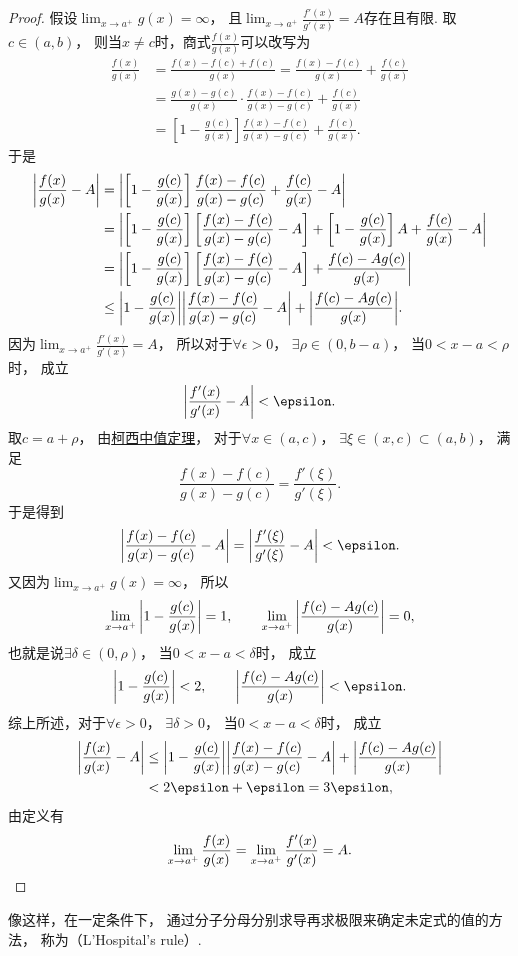 \begin{theorem}
\begin{proof}
假设\(\lim_{x \to a^+} g(x) = \infty\)，
且\(\lim_{x \to a^+} \frac{f'(x)}{g'(x)} = A\)存在且有限.
取\(c\in(a,b)\)，
则当\(x \neq c\)时，商式\(\frac{f(x)}{g(x)}\)可以改写为\begin{align*}
	\frac{f(x)}{g(x)}
	&= \frac{f(x) - f(c) + f(c)}{g(x)}
	= \frac{f(x) - f(c)}{g(x)} + \frac{f(c)}{g(x)} \\
	&= \frac{g(x) - g(c)}{g(x)} \cdot \frac{f(x) - f(c)}{g(x) - g(c)} + \frac{f(c)}{g(x)} \\
	&= \left[1 - \frac{g(c)}{g(x)}\right] \frac{f(x) - f(c)}{g(x) - g(c)} + \frac{f(c)}{g(x)}.
\end{align*}
于是\begin{align*}
	\abs{\frac{f(x)}{g(x)} - A}
	&= \abs{
		\left[1 - \frac{g(c)}{g(x)}\right] \frac{f(x) - f(c)}{g(x) - g(c)}
		+ \frac{f(c)}{g(x)} - A
	} \\
	&= \abs{
		\left[1 - \frac{g(c)}{g(x)}\right]
		\left[\frac{f(x) - f(c)}{g(x) - g(c)} - A\right]
		+ \left[1 - \frac{g(c)}{g(x)}\right] A
		+ \frac{f(c)}{g(x)} - A
	} \\
	&= \abs{
		\left[1 - \frac{g(c)}{g(x)}\right]
		\left[\frac{f(x) - f(c)}{g(x) - g(c)} - A\right]
		+ \frac{f(c) - A g(c)}{g(x)}
	} \\
	&\leq \abs{1 - \frac{g(c)}{g(x)}}
	\abs{\frac{f(x) - f(c)}{g(x) - g(c)} - A}
	+ \abs{\frac{f(c) - A g(c)}{g(x)}}.
\end{align*}
因为\(\lim_{x \to a^+} \frac{f'(x)}{g'(x)} = A\)，
所以对于\(\forall\epsilon>0\)，
\(\exists\rho\in(0,b-a)\)，
当\(0<x-a<\rho\)时，
成立\[
	\abs{\frac{f'(x)}{g'(x)} - A} < \epsilon.
\]
取\(c=a+\rho\)，
由\hyperref[theorem:微分中值定理.柯西中值定理]{柯西中值定理}，
对于\(\forall x \in (a,c)\)，
\(\exists\xi\in(x,c)\subset(a,b)\)，
满足\[
	\frac{f(x) - f(c)}{g(x) - g(c)} = \frac{f'(\xi)}{g'(\xi)}.
\]
于是得到\[
	\abs{\frac{f(x) - f(c)}{g(x) - g(c)} - A}
	= \abs{\frac{f'(\xi)}{g'(\xi)} - A}
	< \epsilon.
\]
又因为\(\lim_{x \to a^+} g(x) = \infty\)，
所以\[
	\lim_{x \to a^+} \abs{1 - \frac{g(c)}{g(x)}} = 1,
	\qquad
	\lim_{x \to a^+} \abs{\frac{f(c) - A g(c)}{g(x)}} = 0,
\]
也就是说\(\exists\delta\in(0,\rho)\)，
当\(0<x-a<\delta\)时，
成立\[
	\abs{1-\frac{g(c)}{g(x)}} < 2, \qquad
	\abs{\frac{f(c) - A g(c)}{g(x)}} < \epsilon.
\]
综上所述，对于\(\forall\epsilon>0\)，
\(\exists\delta>0\)，
当\(0<x-a<\delta\)时，
成立\begin{align*}
	\abs{\frac{f(x)}{g(x)} - A}
	&\leq \abs{1 - \frac{g(c)}{g(x)}}
	\abs{\frac{f(x) - f(c)}{g(x) - g(c)} - A}
	+ \abs{\frac{f(c) - A g(c)}{g(x)}} \\
	&< 2\epsilon + \epsilon = 3\epsilon,
\end{align*}
由定义有\[
	\lim_{x \to a^+} \frac{f(x)}{g(x)}
	= \lim_{x \to a^+} \frac{f'(x)}{g'(x)}
	= A.
	\qedhere
\]
\end{proof}
\end{theorem}
像这样，在一定条件下，
通过分子分母分别求导再求极限来确定未定式的值的方法，
称为（L'Hospital's rule）.

